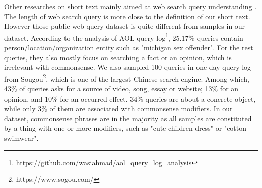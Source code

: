 Other researches on short text mainly aimed at web search query understanding \cite{hua2015short,wang2015query}. %
The length of web search query is more close to the definition of our short text. %
However those public web query dataset \cite{pass2006picture,liu2011users,he2018dureader} is quite different from samples in our dataset. According to the analysis of AOL query log\footnote{https://github.com/wasiahmad/aol\_query\_log\_analysis}, 25.17\% queries contain person/location/organization entity such as "michigan sex offender". For the rest queries, they also mostly focus on searching a fact or an opinion, which is irrelevant with commonsense. 
We also sampled 100 queries in one-day query log\cite{liu2011users} from Sougou\footnote{https://www.sogou.com/}, which is one of the largest Chinese search engine. Among which, 
43\% of queries asks for a source of video, song, essay or website; 
13\% for an opinion, and
10\% for an occurred effect. 
34\% queries are about a concrete object, while only 3\% of them are associated with commonsense modifiers.
In our dataset, commonsense phrases are in the majority as all samples are constituted by a thing with one or more modifiers, such as "cute children dress" or "cotton swimwear".%



